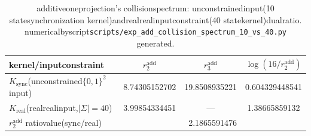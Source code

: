 \begin{table}[H]
\centering
\small
\setlength{\tabcolsep}{6pt}
\renewcommand{\arraystretch}{1.15}
\caption{additiveoneprojection's collisionspectrum: unconstrainedinput(10 statesynchronization kernel)andrealrealinputconstraint(40 statekernel)dualratio. numericalbyscript\texttt{scripts/exp\_add\_collision\_spectrum\_10\_vs\_40.py} generated.}
\label{tab:add-collision-spectrum-10-vs-40}
\begin{tabular}{@{}lccc@{}}
\toprule
kernel/inputconstraint& $r^{\mathrm{add}}_2$ & $r^{\mathrm{add}}_3$ & $\log(16/r^{\mathrm{add}}_2)$ \\
\midrule
$K_{\mathrm{sync}}$(unconstrained$\{0,1\}^2$ input)& 8.74305152702 & 19.8508935221 & 0.604329448541 \\
$K_{\mathrm{real}}$(realrealinput,$|\Sigma|=40$) & 3.99854334451 & --- & 1.38665859132 \\
\midrule
$r^{\mathrm{add}}_2$ ratiovalue(sync/real) & \multicolumn{3}{c}{2.1865591476} \\
\bottomrule
\end{tabular}
\end{table}
